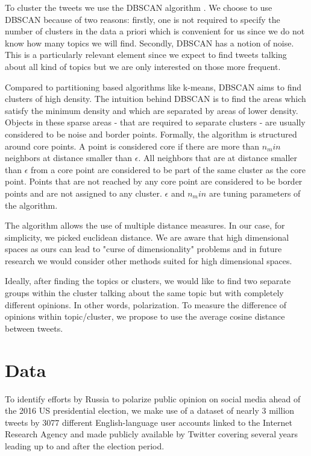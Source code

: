 \documentclass[12pt, authoryear]{elsarticle}
\begin{document}
To cluster the tweets we use the DBSCAN algorithm \cite{ester1996density}. We choose to use DBSCAN  because of two reasons: firstly, one is not required to specify the number of clusters in the data a priori which is convenient for us since we do not know how many topics we will find. Secondly, DBSCAN has a notion of noise. This is a particularly relevant element since we expect to find tweets talking about all kind of topics but we are only interested on those more frequent.

Compared to partitioning based algorithms like k-means, DBSCAN aims to find clusters of high density. The intuition behind DBSCAN is to find the areas which satisfy the minimum density and which are separated by areas of lower density. Objects in these sparse areas - that are required to separate clusters - are usually considered to be noise and border points. Formally, the algorithm is structured around core points. A point is considered core if there are more than $n_min$ neighbors at distance smaller than $\epsilon$. All neighbors that are at distance smaller than $\epsilon$ from a core point are considered to be part of the same cluster as the core point. Points that are not reached by any core point are considered to be border points and are not assigned to any cluster. $\epsilon$ and $n_min$ are tuning parameters of the algorithm.

The algorithm allows the use of multiple distance measures. In our case, for simplicity, we picked euclidean distance. We are aware that high dimensional spaces as ours can lead to "curse of dimensionality" problems and in future research we would consider other methods suited for high dimensional spaces.

Ideally, after finding the topics or clusters, we would like to find two separate groups within the cluster talking about the same topic but with completely different opinions. In other words, polarization. To measure the difference of opinions within topic/cluster, we propose to use the average cosine distance between tweets.

\section{Data}\label{data}
To identify efforts by Russia to polarize public opinion on social media ahead of the 2016 US presidential election, we make use of a dataset of nearly 3 million tweets by 3077 different English-language user accounts linked to the Internet Research Agency and made publicly available by Twitter covering several years leading up to and after the election period.
\end{document}
